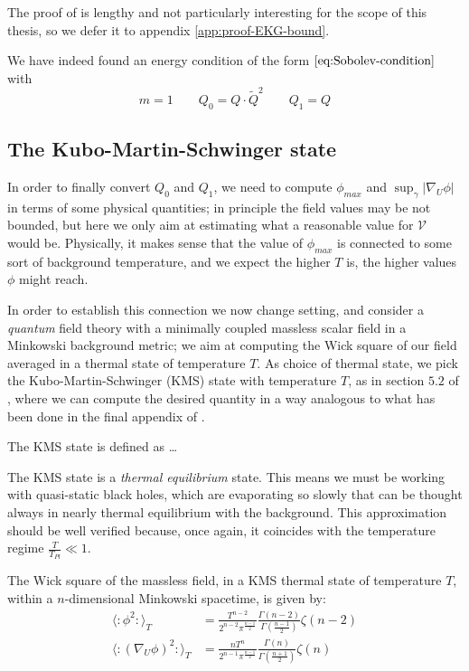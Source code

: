 The proof of is lengthy and not particularly interesting for the scope of this thesis, so we defer it to appendix \ref{app:proof-EKG-bound}.

We have indeed found an energy condition of the form \(\eqref{eq:Sobolev-condition}\) with 
\[
m = 1 \quad\quad Q_0 = Q\cdot\tilde{Q}^2 \quad\quad Q_1 = Q 
\]

\subsection{The Kubo-Martin-Schwinger state}

In order to finally convert \(Q_0\) and \(Q_1\), we need to compute \(\phi_{max}\) and \(\sup_{\gamma}\vert \nabla_U\phi\vert\) in terms of some physical quantities; in principle the field values may be not bounded, but here we only aim at estimating what a reasonable value for \(\mathcal{V}\) would be.
Physically, it makes sense that the value of \(\phi_{max}\) is connected to some sort of background temperature, and we expect the higher \(T\) is, the higher values \(\phi\) might reach.

In order to establish this connection we now change setting, and consider a \emph{quantum} field theory with a minimally coupled massless scalar field in a Minkowski background metric; we aim at computing the Wick square of our field averaged in a thermal state of temperature \(T\). As choice of thermal state, we pick the Kubo-Martin-Schwinger (KMS) state with temperature \(T\), as in section \(5.2\) of \cite{fewster2020new}, where we can compute the desired quantity in a way analogous to what has been done in the final appendix of \cite{brown2018singularity}.

\begin{definition}
    The KMS state is defined as \dots
\end{definition}

\begin{remark}
	The KMS state is a \emph{thermal equilibrium} state. This means we must be working with quasi-static black holes, which are evaporating so slowly that can be thought always in nearly thermal equilibrium with the background. This approximation should be well verified because, once again, it coincides with the temperature regime \(\frac{T}{T_{Pl}}\ll 1\).
\end{remark}

\begin{prop}
	\label{prop:wick-squares-KMS}
    The Wick square of the massless field, in a KMS thermal state of temperature \(T\), within a \(n\)-dimensional Minkowski spacetime, is given by:
    \begin{align*}
         \langle \colon \phi^2 \colon\rangle_T &= \frac{T^{n - 2}}{2^{n - 2}\pi^{\frac{n - 1}{2}}}\frac{\Gamma(n - 2)}{\Gamma\left(\frac{n - 1}{2}\right)}\zeta(n - 2) \\
        \langle \colon (\nabla_U\phi)^2 \colon\rangle_T &= \frac{nT^n}{2^{n - 1}\pi^{\frac{n - 1}{2}}} \frac{\Gamma(n)}{\Gamma\left(\frac{n + 1}{2}\right)} \zeta(n)
    \end{align*}

\end{prop}
    
